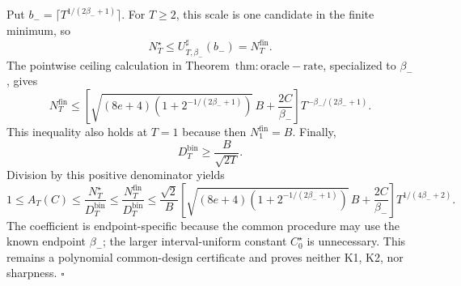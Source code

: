 Put \(b_-=\lceil T^{1/(2\beta_-+1)}\rceil\). For \(T\ge2\), this scale is one candidate in the finite minimum, so
\[
N_T^\star\le U_{T,\beta_-}^{\sharp}(b_-)=N_T^{\mathrm{fin}}.
\]
The pointwise ceiling calculation in Theorem~\(\mathrm{thm:oracle-rate}\), specialized to \(\beta_-\), gives
\[
N_T^{\mathrm{fin}}
\le
\left[\sqrt{(8e+4)\left(1+2^{-1/(2\beta_-+1)}\right)}\,B+\frac{2C}{\beta_-}\right]
T^{-\beta_-/(2\beta_-+1)}.
\]
This inequality also holds at \(T=1\) because then \(N_1^{\mathrm{fin}}=B\). Finally,
\[
D_T^{\mathrm{bin}}\ge\frac{B}{\sqrt{2T}}.
\]
Division by this positive denominator yields
\[
1\le A_T(C)
\le\frac{N_T^\star}{D_T^{\mathrm{bin}}}
\le\frac{N_T^{\mathrm{fin}}}{D_T^{\mathrm{bin}}}
\le\frac{\sqrt2}{B}
\left[\sqrt{(8e+4)\left(1+2^{-1/(2\beta_-+1)}\right)}\,B+\frac{2C}{\beta_-}\right]
T^{1/(4\beta_-+2)}.
\]
The coefficient is endpoint-specific because the common procedure may use the known endpoint \(\beta_-\); the larger interval-uniform constant \(C_0^\star\) is unnecessary. This remains a polynomial common-design certificate and proves neither K1, K2, nor sharpness. \(\square\)
